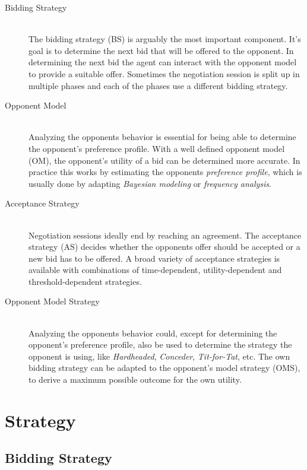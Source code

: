 \documentclass[a4paper,10pt]{article}
\begin{document}
\begin{description}
  \item[Bidding Strategy] \hfill \\
  The bidding strategy (BS) is arguably the most important component. It's goal is to determine the next bid that will be offered to the opponent. In determining the next bid the agent can interact with the opponent model to provide a suitable offer. Sometimes the negotiation session is split up in multiple phases and each of the phases use a different bidding strategy.

  \item[Opponent Model] \hfill \\
  Analyzing the opponents behavior is essential for being able to determine the opponent's preference profile.  With a well defined opponent model (OM), the opponent's utility of a bid can be determined more accurate. In practice this works by estimating the opponents \emph{preference profile}, which is usually done by adapting \emph{Bayesian modeling} or \emph{frequency analysis}. 

  \item[Acceptance Strategy] \hfill \\
  Negotiation sessions ideally end by reaching an agreement. The acceptance strategy (AS) decides whether the opponents offer should be accepted or a new bid has to be offered. A broad variety of acceptance strategies is available with combinations of time-dependent, utility-dependent and threshold-dependent strategies.

\item[Opponent Model Strategy] \hfill \\
  Analyzing the opponents behavior could, except for determining the opponent's preference profile, also be used to determine the strategy the opponent is using, like \emph{Hardheaded}, \emph{Conceder}, \emph{Tit-for-Tat}, etc. The own bidding strategy can be adapted to the opponent's model strategy (OMS), to derive a maximum possible outcome for the own utility.

\end{description}

\section{Strategy}
\label{sec:strategy}

\subsection{Bidding Strategy}
\label{sec:strategyBS}

\end{document}
